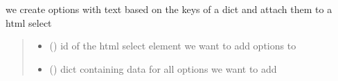 \documentclass[letterpaper,10pt,english]{sphinxmanual}
\begin{document}

\begin{fulllineitems}
\label{\detokenize{docs_gui/js_api/urbs_editor/process_editor:populateProcessEditorList}}
\pysigstartsignatures
{}
\pysigstopsignatures
\sphinxAtStartPar
we create options with text based on the keys of a dict and attach them to a html select
\begin{quote}\begin{description}
\begin{itemize}
\item {} 
\sphinxAtStartPar
{} () \textendash{} id of the html select element we want to add options to

\item {} 
\sphinxAtStartPar
{} () \textendash{} dict containing data for all options we want to add

\end{itemize}

\end{description}\end{quote}

\end{fulllineitems}

\end{document}
